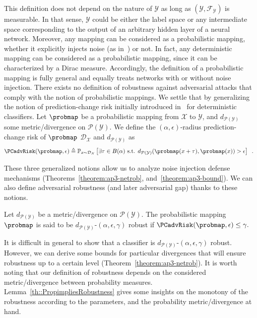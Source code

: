This definition does not depend on the nature of $\mathcal{Y}$ as long as $(\mathcal{Y},\mathcal{F}_{\mathcal{Y}})$ is measurable.
In that sense, $\mathcal{Y}$ could be either the label space or any intermediate space corresponding to the output of an arbitrary hidden layer of a neural network.
Moreover, any mapping can be considered as a probabilistic mapping, whether it explicitly injects noise (as in~\cite{lecuyer2018certified,rakin2018parametricnoiseinjection,pruningDefenseICLR2018}) or not.
In fact, any deterministic mapping can be considered as a probabilistic mapping, since it can be characterized by a Dirac measure.
Accordingly, the definition of a probabilistic mapping is fully general and equally treats networks with or without noise injection.
There exists no definition of robustness against adversarial attacks that comply with the notion of probabilistic mappings.
We settle that by generalizing the notion of prediction-change risk initially introduced in~\cite{NIPS2018Mahloujifar} for deterministic classifiers.
Let $\probmap$ be a probabilistic mapping from $\mathcal{X}$ to $\mathcal{Y}$, and $d_{\mathcal{P}(\mathcal{Y})}$ some metric/divergence on $\mathcal{P}(\mathcal{Y})$.
We define the $(\alpha,\epsilon)$-radius prediction-change risk of $\probmap$ \wrt $\mathcal{D}_{\mathcal{X}}$ and $d_{\mathcal{P}(\mathcal{Y})}$ as 
\begin{equation}
  \PCadvRisk(\probmap,\epsilon) \triangleq  \mathbb{P}_{x\sim \mathcal{D}_{\mathcal{X}}}\left[ \exists \tau \in B(\alpha) \text{ s.t. } d_{\mathcal{P}(\mathcal{Y})}(\probmap(x+\tau),\probmap(x)) > \epsilon \right] \enspace.
\end{equation}

These three generalized notions allow us to analyze noise injection defense mechanisms (Theorems~\ref{theorem:ap3-netrob}, and~\ref{theorem:ap3-bound}).
We can also define adversarial robustness (and later adversarial gap) thanks to these notions. 

\begin{definition}
  Let $d_{\mathcal{P}(\mathcal{Y})}$ be a metric/divergence on $\mathcal{P}(\mathcal{Y})$.
  The probabilistic mapping $\probmap$ is said to be $d_{\mathcal{P}(\mathcal{Y})}$-$(\alpha, \epsilon, \gamma)$ robust if $\PCadvRisk(\probmap,\epsilon) \leq \gamma.$ 
  \label{def::GeneralizedRobustness}
\end{definition}

It is difficult in general to show that a classifier is $d_{\mathcal{P}(\mathcal{Y})}$-$(\alpha, \epsilon, \gamma)$ robust.
However, we can  derive some bounds for particular divergences that will ensure robustness up to a certain level (Theorem~\ref{theorem:ap3-netrob}).
It is worth noting that our definition of robustness depends on the considered metric/divergence between probability measures.
Lemma~\ref{th::PropimpliesRobustness} gives some insights on the monotony of the robustness according to the parameters, and the probability metric/divergence at hand.

